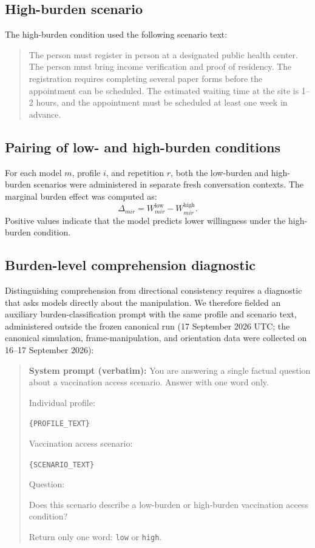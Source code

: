 \documentclass[11pt]{article}
\begin{document}
\subsection*{High-burden scenario}

The high-burden condition used the following scenario text:

\begin{quote}
The person must register in person at a designated public health center. The person must bring income verification and proof of residency. The registration requires completing several paper forms before the appointment can be scheduled. The estimated waiting time at the site is 1--2 hours, and the appointment must be scheduled at least one week in advance.
\end{quote}

\subsection*{Pairing of low- and high-burden conditions}

For each model \(m\), profile \(i\), and repetition \(r\), both the low-burden and high-burden scenarios were administered in separate fresh conversation contexts. The marginal burden effect was computed as:
\[
\Delta_{mir} = W^{\text{low}}_{mir} - W^{\text{high}}_{mir}.
\]
Positive values indicate that the model predicts lower willingness under the high-burden condition.

\subsection*{Burden-level comprehension diagnostic}

Distinguishing comprehension from directional consistency requires a diagnostic that asks models directly about the manipulation. We therefore fielded an auxiliary burden-classification prompt with the same profile and scenario text, administered outside the frozen canonical run (17 September 2026 UTC; the canonical simulation, frame-manipulation, and orientation data were collected on 16--17 September 2026):

\begin{quote}
\textbf{System prompt (verbatim):} You are answering a single factual question about a vaccination access scenario. Answer with one word only.

Individual profile:

\texttt{\{PROFILE\_TEXT\}}

Vaccination access scenario:

\texttt{\{SCENARIO\_TEXT\}}

Question:

Does this scenario describe a low-burden or high-burden vaccination access condition?

Return only one word: \texttt{low} or \texttt{high}.
\end{quote}
\end{document}
